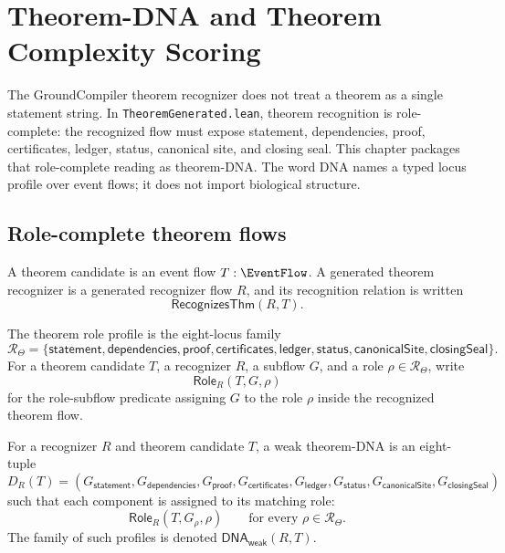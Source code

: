 \chapter{Theorem-DNA and Theorem Complexity Scoring}
\label{ch:theorem-dna-complexity-scoring}

The GroundCompiler theorem recognizer does not treat a theorem as a single
statement string. In \texttt{TheoremGenerated.lean}, theorem recognition is
role-complete: the recognized flow must expose statement, dependencies, proof,
certificates, ledger, status, canonical site, and closing seal. This chapter
packages that role-complete reading as theorem-DNA. The word DNA names a typed
locus profile over event flows; it does not import biological structure.

\section{Role-complete theorem flows}
\label{sec:theorem-dna-role-complete-flows}

\begin{definition}
\label{def:theorem-dna-candidate-recognizer}
A theorem candidate is an event flow $T:\EventFlow$. A generated theorem
recognizer is a generated recognizer flow $R$, and its recognition relation is
written
$$
\mathsf{RecognizesThm}(R,T).
$$
\end{definition}

\begin{definition}
\label{def:theorem-dna-role-loci}
The theorem role profile is the eight-locus family
$$
\mathcal R_{\Theta}=
\{\mathsf{statement},\mathsf{dependencies},\mathsf{proof},
\mathsf{certificates},\mathsf{ledger},\mathsf{status},
\mathsf{canonicalSite},\mathsf{closingSeal}\}.
$$
For a theorem candidate $T$, a recognizer $R$, a subflow $G$, and a role
$\rho\in\mathcal R_{\Theta}$, write
$$
\mathsf{Role}_{R}(T,G,\rho)
$$
for the role-subflow predicate assigning $G$ to the role $\rho$ inside the
recognized theorem flow.
\end{definition}

\begin{definition}
\label{def:weak-theorem-dna}
For a recognizer $R$ and theorem candidate $T$, a weak theorem-DNA is an
eight-tuple
$$
D_R(T)=
(G_{\mathsf{statement}},G_{\mathsf{dependencies}},G_{\mathsf{proof}},
G_{\mathsf{certificates}},G_{\mathsf{ledger}},G_{\mathsf{status}},
G_{\mathsf{canonicalSite}},G_{\mathsf{closingSeal}})
$$
such that each component is assigned to its matching role:
$$
\mathsf{Role}_{R}(T,G_{\rho},\rho)
\qquad
\text{for every }\rho\in\mathcal R_{\Theta}.
$$
The family of such profiles is denoted $\mathsf{DNA}_{\mathsf{weak}}(R,T)$.
\end{definition}

